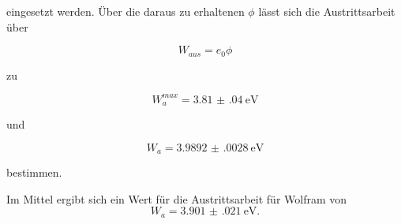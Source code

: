 eingesetzt werden. Über die daraus zu erhaltenen $\phi$ lässt sich die Austrittsarbeit über

\begin{equation}
    W_{aus}=e_0\phi
\end{equation}

zu

\begin{equation*}
    W_a^{max}=\SI{3.81(04)}{\eV} 
\end{equation*}

und

\begin{equation*}
W_a=\SI{3.9892(0028)}{\eV}
\end{equation*}

bestimmen.

Im Mittel ergibt sich ein Wert für die Austrittsarbeit für Wolfram von
\begin{equation}
   W_{a}=\SI{3.901(021)}{\eV}.
\end{equation}


%
